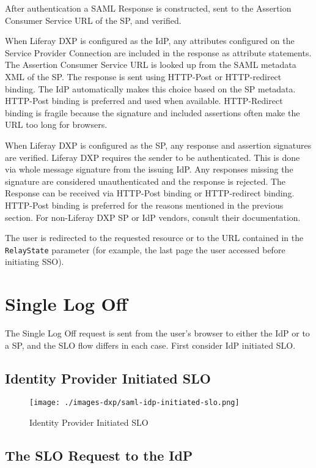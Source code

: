 After authentication a SAML Response is constructed, sent to the
Assertion Consumer Service URL of the SP, and verified.

When Liferay DXP is configured as the IdP, any attributes configured on
the Service Provider Connection are included in the response as
attribute statements. The Assertion Consumer Service URL is looked up
from the SAML metadata XML of the SP. The response is sent using
HTTP-Post or HTTP-redirect binding. The IdP automatically makes this
choice based on the SP metadata. HTTP-Post binding is preferred and used
when available. HTTP-Redirect binding is fragile because the signature
and included assertions often make the URL too long for browsers.

When Liferay DXP is configured as the SP, any response and assertion
signatures are verified. Liferay DXP requires the sender to be
authenticated. This is done via whole message signature from the issuing
IdP. Any responses missing the signature are considered unauthenticated
and the response is rejected. The Response can be received via HTTP-Post
binding or HTTP-redirect binding. HTTP-Post binding is preferred for the
reasons mentioned in the previous section. For non-Liferay DXP SP or IdP
vendors, consult their documentation.

The user is redirected to the requested resource or to the URL contained
in the \texttt{RelayState} parameter (for example, the last page the
user accessed before initiating SSO).

\section{Single Log Off}\label{single-log-off}

The Single Log Off request is sent from the user's browser to either the
IdP or to a SP, and the SLO flow differs in each case. First consider
IdP initiated SLO.

\subsection{Identity Provider Initiated
SLO}\label{identity-provider-initiated-slo}

\begin{figure}
\centering
\texttt{[image: ./images-dxp/saml-idp-initiated-slo.png]}
\caption{Identity Provider Initiated SLO}
\end{figure}

\subsection{The SLO Request to the IdP}\label{the-slo-request-to-the-idp}

